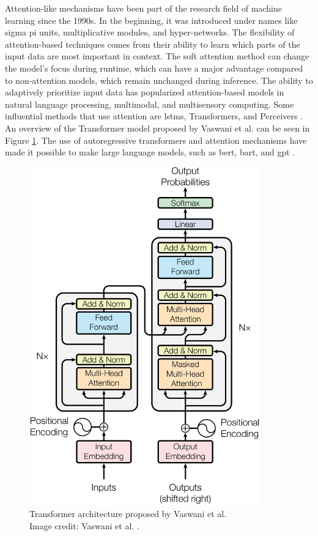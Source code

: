     Attention-like mechanisms have been part of the research field of machine learning since the 1990s. In the beginning, it was introduced under names like sigma pi units, multiplicative modules, and hyper-networks. The flexibility of attention-based techniques comes from their ability to learn which parts of the input data are most important in context. The soft attention method can change the model's focus during runtime, which can have a major advantage compared to non-attention models, which remain unchanged during inference. The ability to adaptively prioritize input data has popularized attention-based models in natural language processing, multimodal, and multisensory computing. Some influential methods that use attention are \glspl{lstm}, Transformers, and Perceivers \cite{hochreiterLongShorttermMemory1997, vaswaniAttentionAllYou2017, jaeglePerceiverGeneralPerception2021}. An overview of the Transformer model proposed by Vaswani et al. \cite{vaswaniAttentionAllYou2017} can be seen in Figure \ref{fig:transformer_architecture}. The use of autoregressive transformers and attention mechanisms have made it possible to make large language models, such as \gls{bert}, \gls{bart}, and \gls{gpt} \cite{devlinBERTPretrainingDeep2019, lewisBARTDenoisingSequencetoSequence2019, radfordImprovingLanguageUnderstanding2018, radfordLanguageModelsAre2019, brownLanguageModelsAre2020, openaiGPT4TechnicalReport2023}. 


    \begin{figure}[htb]
        \centering
        \centerline{
        \includegraphics[width=10cm]{images/Transformer_architecture.png}}
        \caption[Transformer architecture proposed by Vaswani et al.]{Transformer architecture proposed by Vaswani et al.\\
        Image credit: Vaswani et al. \cite{vaswaniAttentionAllYou2017}.}
        \label{fig:transformer_architecture}
    \end{figure}
    
